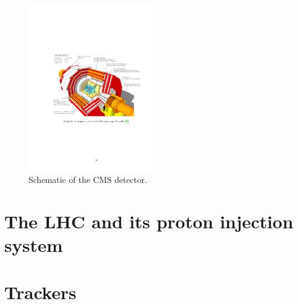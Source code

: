 \begin{figure}[hb]
\centering
\includegraphics[width=0.5\textwidth]{figures/cms_detector.pdf}
\caption{Schematic of the CMS detector.}
\label{fig:cmsdetector}
\end{figure}
\section{The LHC and its proton injection system}

\section{Trackers}

